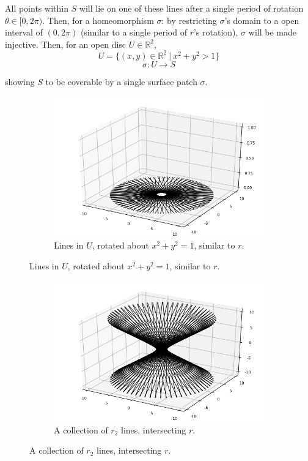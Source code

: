 \documentclass[12pt]{article}
\begin{document}
  \indent
  All points within $S$ will lie on one of these lines after a single period of rotation \newline $\theta \in [0,2\pi)$. Then, for a homeomorphism $\sigma$: by restricting $\sigma$'s domain to a open interval of $(0,2\pi)$ (similar to a single period of $r$'s rotation), $\sigma$ will be made injective. Then, for an open disc $U \in \mathbb{R}^2$,
   $$
  U = \lbrace (x,y) \in \mathbb{R}^2  \ \vert \ x^2 + y^2 > 1\rbrace 
  $$
  $$
  \sigma : U \rightarrow S
  $$

showing $S$ to be coverable by a single surface patch $\sigma$.

\begin{figure}[h!]
  \centering
      \begin{subfigure}[b]{0.6\linewidth}
    \includegraphics[width=\linewidth]{./assets/4-1-3/hyperboloid-line-rotation-planar.png}
    \caption*{Lines in $U$, rotated about $x^2+y^2=1$, similar to $r$.}
  \end{subfigure}
  \end{figure}


\clearpage
\begin{figure}[h!]
  \centering
      \begin{subfigure}[b]{0.6\linewidth}
    \includegraphics[width=\linewidth]{./assets/4-1-3/hyperboloid-line-rotation-skew.png}
    \caption*{A collection of $r_2$ lines, intersecting $r$.}
  \end{subfigure}
  \end{figure}
\end{document}
